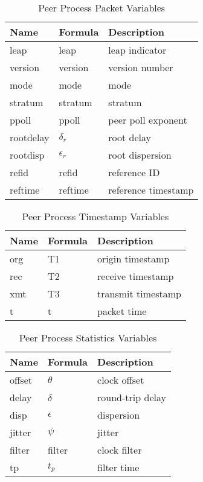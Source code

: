 \begin{table}[htb]
  \center
  \begin{tabular}{| l | l | l |}
    \hline
    Name & Formula & Description \\
    \hline
    \hline
    leap & leap & leap indicator \\
    version & version & version number \\
    mode & mode & mode \\
    stratum & stratum & stratum \\
    ppoll & ppoll & peer poll exponent \\
    rootdelay & $ \delta_r $ & root delay \\
    rootdisp & $ \epsilon_r $ & root dispersion \\
    refid & refid & reference ID \\
    reftime & reftime & reference timestamp \\
    \hline
  \end{tabular}
  \caption{Peer Process Packet Variables}
  \label{peer_process_packet_variables}
\end{table}

\begin{table}[htb]
  \center
  \begin{tabular}{| l | l | l |}
    \hline
    Name & Formula & Description \\
    \hline
    \hline
    org & T1 & origin timestamp \\
    rec & T2 & receive timestamp \\
    xmt & T3 & transmit timestamp \\
    t & t & packet time \\
    \hline
  \end{tabular}
  \caption{Peer Process Timestamp Variables}
  \label{peer_process_timestamp_variables}
\end{table}

\begin{table}[htb]
  \center
  \begin{tabular}{| l | l | l |}
    \hline
    Name & Formula & Description \\
    \hline
    \hline
    offset & $ \theta $ & clock offset \\
    delay & $ \delta $ & round-trip delay\\
    disp & $ \epsilon $ & dispersion \\
    jitter & $ \psi $ & jitter \\
    filter & filter & clock filter \\
    tp & $ t_p $ & filter time \\
    \hline
  \end{tabular}
  \caption{Peer Process Statistics Variables}
  \label{peer_process_statistics_variables}
\end{table}

